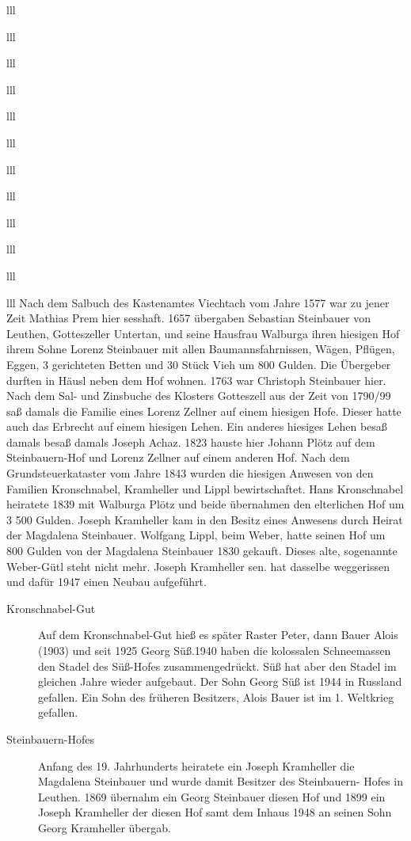 \documentclass[12pt,a4pager]{book}
\begin{document}
\begin{tabuluar}{lll}
\begin{tabuluar}{lll}
\begin{tabuluar}{lll}
\begin{tabuluar}{lll}
\begin{tabuluar}{lll}
\begin{tabuluar}{lll}
\begin{tabuluar}{lll}
\begin{tabuluar}{lll}
\begin{tabuluar}{lll}
\begin{tabuluar}{lll}
\begin{tabuluar}{lll}
\begin{tabuluar}{lll}
Nach dem Salbuch des Kastenamtes Viechtach vom Jahre 1577 war zu jener Zeit
Mathias Prem hier sesshaft. 1657 übergaben Sebastian Steinbauer von Leuthen,
Gotteszeller Untertan, und seine Hausfrau Walburga ihren hiesigen Hof ihrem
Sohne Lorenz Steinbauer mit allen Baumannsfahrnissen, Wägen, Pflügen, Eggen, 3
gerichteten Betten und 30 Stück Vieh um 800 Gulden. Die Übergeber durften in
Häusl neben dem Hof wohnen. 1763 war Christoph Steinbauer hier. Nach dem Sal-
und Zinsbuche des Klosters Gotteszell aus der Zeit von 1790/99 saß damals die
Familie eines Lorenz Zellner auf einem hiesigen Hofe. Dieser hatte auch das
Erbrecht auf einem hiesigen Lehen. Ein anderes hiesiges Lehen besaß damals besaß
damals Joseph Achaz. 1823 hauste hier Johann Plötz auf dem Steinbauern-Hof und
Lorenz Zellner auf einem anderen Hof. Nach dem Grundsteuerkataster vom Jahre
1843 wurden die hiesigen Anwesen von den Familien Kronschnabel, Kramheller und
Lippl bewirtschaftet. Hans Kronschnabel heiratete 1839 mit Walburga Plötz und
beide übernahmen den elterlichen Hof um 3 500 Gulden. Joseph Kramheller kam in
den Besitz eines Anwesens durch Heirat der Magdalena Steinbauer. Wolfgang Lippl,
beim Weber, hatte seinen Hof um 800 Gulden von der Magdalena Steinbauer 1830
gekauft. Dieses alte, sogenannte Weber-Gütl steht nicht mehr. Joseph Kramheller
sen. hat dasselbe weggerissen und dafür 1947 einen Neubau aufgeführt.

\begin{description}
\item[Kronschnabel-Gut] Auf dem Kronschnabel-Gut hieß es später Raster Peter,
dann Bauer Alois (1903) und seit 1925 Georg Süß.1940 haben die kolossalen
Schneemassen den Stadel des Süß-Hofes zusammengedrückt. Süß hat aber den Stadel
im gleichen Jahre wieder aufgebaut. Der Sohn Georg Süß ist 1944 in Russland
gefallen. Ein Sohn des früheren Besitzers, Alois Bauer ist im 1. Weltkrieg
gefallen.

\item[Steinbauern-Hofes] Anfang des 19. Jahrhunderts heiratete ein Joseph
Kramheller die Magdalena Steinbauer und wurde damit Besitzer des Steinbauern-
Hofes in Leuthen. 1869 übernahm ein Georg Steinbauer diesen Hof und 1899 ein
Joseph Kramheller der diesen Hof samt dem Inhaus 1948 an seinen Sohn Georg
Kramheller übergab.
\end{description}


\end{tabuluar}
\end{tabuluar}
\end{tabuluar}
\end{tabuluar}
\end{tabuluar}
\end{tabuluar}
\end{tabuluar}
\end{tabuluar}
\end{tabuluar}
\end{tabuluar}
\end{tabuluar}
\end{tabuluar}
\end{document}
